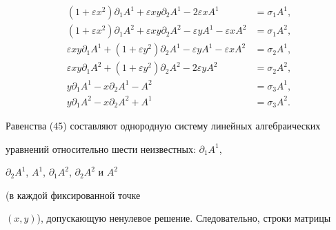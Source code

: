 \begin{equation} 


\begin{split} 


(1+\varepsilon x^2)\partial_1A^1+\varepsilon x y\partial_2A^1- 


2\varepsilon x A^1&=\sigma_1A^1,\\ 


% 


(1+\varepsilon x^2)\partial_1A^2+\varepsilon x y \partial_2A^2- 


\varepsilon y A^1-\varepsilon x A^2&=\sigma_1A^2,\\ 


% 


\varepsilon x y\partial_1A^1+(1+\varepsilon y^2) \partial_2A^1-


\varepsilon y A^1-\varepsilon x A^2&=\sigma_2A^1,\\


% 


\varepsilon x y\partial_1A^2+(1+\varepsilon y^2) 


\partial_2A^2-2\varepsilon y A^2&=\sigma_2A^2,\\ 


% 


y\partial_1A^1-x\partial_2A^1-A^2&=\sigma_3A^1,\\ 


% 


y\partial_1A^2-x\partial_2A^2+A^1&=\sigma_3A^2. 


\end{split} 


\end{equation} 


Равенства (45) составляют однородную систему линейных алгебраических 


уравнений относительно шести неизвестных: $\partial_1A^1$, 


$\partial_2A^1$, $A^1$, $\partial_1A^2$, $\partial_2A^2$ и $A^2$ 


(в каждой фиксированной точке 


$(x,y)$), допускающую ненулевое решение. Следовательно, строки матрицы 


$$ 


